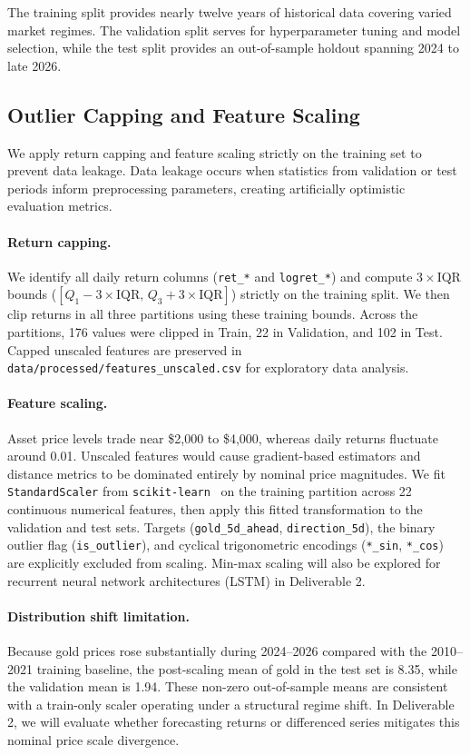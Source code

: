 The training split provides nearly twelve years of historical data covering varied market regimes. The validation split serves for hyperparameter tuning and model selection, while the test split provides an out-of-sample holdout spanning 2024 to late 2026.

\subsection{Outlier Capping and Feature Scaling}

We apply return capping and feature scaling strictly on the training set to prevent data leakage. Data leakage occurs when statistics from validation or test periods inform preprocessing parameters, creating artificially optimistic evaluation metrics.

\paragraph{Return capping.}
We identify all daily return columns (\texttt{ret\_*} and \texttt{logret\_*}) and compute $3\times\text{IQR}$ bounds ($[Q_1 - 3\times\text{IQR},\, Q_3 + 3\times\text{IQR}]$) strictly on the training split. We then clip returns in all three partitions using these training bounds. Across the partitions, 176 values were clipped in Train, 22 in Validation, and 102 in Test. Capped unscaled features are preserved in \texttt{data/processed/features\_unscaled.csv} for exploratory data analysis.

\paragraph{Feature scaling.}
Asset price levels trade near \$2,000 to \$4,000, whereas daily returns fluctuate around 0.01. Unscaled features would cause gradient-based estimators and distance metrics to be dominated entirely by nominal price magnitudes. We fit \texttt{StandardScaler} from \texttt{scikit-learn}~\cite{b_pedregosa2011} on the training partition across 22 continuous numerical features, then apply this fitted transformation to the validation and test sets. Targets (\texttt{gold\_5d\_ahead}, \texttt{direction\_5d}), the binary outlier flag (\texttt{is\_outlier}), and cyclical trigonometric encodings (\texttt{*\_sin}, \texttt{*\_cos}) are explicitly excluded from scaling. Min-max scaling will also be explored for recurrent neural network architectures (LSTM) in Deliverable 2.

\paragraph{Distribution shift limitation.}
Because gold prices rose substantially during 2024--2026 compared with the 2010--2021 training baseline, the post-scaling mean of gold in the test set is 8.35, while the validation mean is 1.94. These non-zero out-of-sample means are consistent with a train-only scaler operating under a structural regime shift. In Deliverable 2, we will evaluate whether forecasting returns or differenced series mitigates this nominal price scale divergence.

